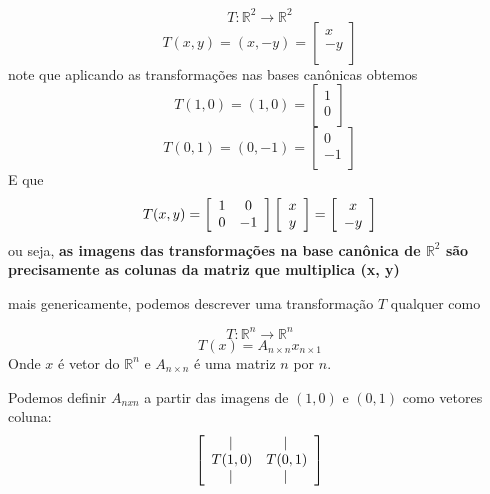 \[ T: \mathbb{R}^2 \longrightarrow \mathbb{R}^2 \]
\[ T(x, y) = (x, -y) =
  \left[ 
  {
    \begin{array}{c}
    x \\
   -y \\
    \end{array} 
    } 
  \right]
\]
note que aplicando as transformações nas bases canônicas obtemos
\[
T(1,0) = 
(1, 0) =
\left[ 
    {
        \begin{array}{c}
            1      \\
            0      \\
        \end{array} 
    } 
\right]
\]
\[
T(0,1) = 
(0, -1) =
\left[ 
    {
        \begin{array}{c}
            0      \\
            -1      \\
        \end{array} 
    } 
\right]
\]
E que 
\[ T(x, y) =
    \left[ 
    {
        \begin{array}{c c}
            1 &  0 \\
            0 & -1 \\
        \end{array} 
    } 
    \right]
    \left[ 
    {
        \begin{array}{c}
            x \\
            y \\
        \end{array} 
    } 
    \right]
    =
    \left[ 
    {
        \begin{array}{c}
            x \\
            -y \\
        \end{array} 
    } 
    \right]
\]
ou seja, \textbf{as imagens das transformações na base canônica de \( \mathbb{R}^{2} \) são precisamente as colunas da matriz que multiplica (x, y)}

\begin{remark}

mais genericamente, podemos descrever uma transformação \(T\) qualquer como


\[
    T: \mathbb{R}^{n} \longrightarrow \mathbb{R}^{n} 
\]
\[
    T(x) = A_{n \times n}x_{n \times 1} 
\]
Onde \(x\) é vetor do \(\mathbb{R}^{n}\) e \( A_{n \times n}\) é uma matriz \(n\) por \(n\).

Podemos definir \(A_{n x n}\) a partir das imagens de \( (1,0) \) e \( (0,1) \) como vetores coluna:
\[
    \left[ 
        {
            \begin{array}{c c}
                |\,    & |\,      \\
                T(1,0) & T(0,1)   \\
                |\,    & |\,      \\
            \end{array} 
        } 
    \right]
\]
\end{remark}

